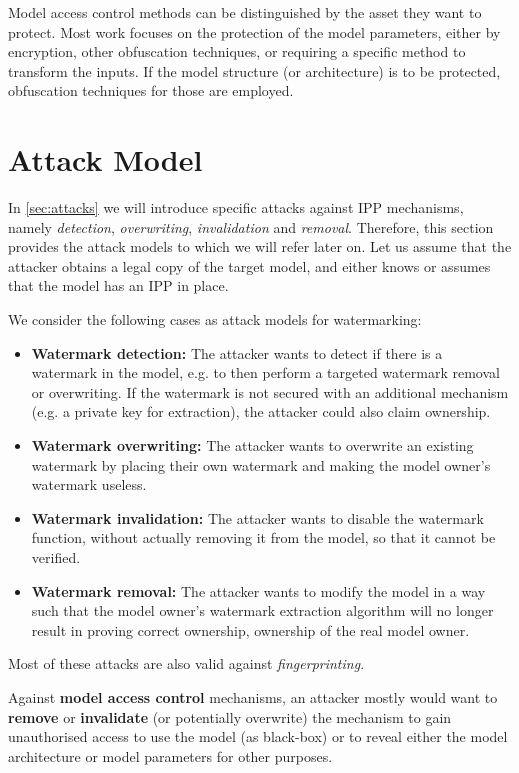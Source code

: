 Model access control methods can be distinguished by the asset they want to protect. Most work focuses on the protection of the model parameters, either by encryption, other obfuscation techniques, or requiring a specific method to transform the inputs. If the model structure (or architecture) is to be protected, obfuscation techniques for those are employed.

\section{Attack Model} \label{sec:attack-model}

In \cref{sec:attacks} we will introduce specific attacks against IPP mechanisms, namely \textit{detection}, \textit{overwriting}, \textit{invalidation} and \textit{removal}. Therefore, this section provides the attack models to which we will refer later on. Let us assume that the attacker obtains a legal copy of the target model, and either knows or assumes that the model has an IPP in place.

We consider the following cases as attack models for watermarking:

\begin{itemize}
    \item  
\textbf{Watermark detection:} The attacker wants to detect if there is a watermark in the model, e.g. to then perform a targeted watermark removal or overwriting. If the watermark is not secured with an additional mechanism (e.g. a private key for extraction), the attacker could also claim ownership.
\item \textbf{Watermark overwriting:} The attacker wants to overwrite an existing watermark by placing their own watermark and making the model owner's watermark useless.
\item \textbf{Watermark invalidation:} The attacker wants to disable the watermark function, without actually removing it from the model, so that it cannot be verified. 
\item \textbf{Watermark removal:} The attacker wants to modify the model in a way such that the model owner's watermark extraction algorithm will no longer result in proving correct ownership, ownership of the real model owner.
\end{itemize}

Most of these attacks are also valid against \textit{fingerprinting}.

Against \textbf{model access control} mechanisms, an attacker mostly would want to \textbf{remove} or \textbf{invalidate} (or potentially overwrite) the mechanism to gain unauthorised access to use the model (as black-box) or to reveal either the model architecture or model parameters for other purposes.

